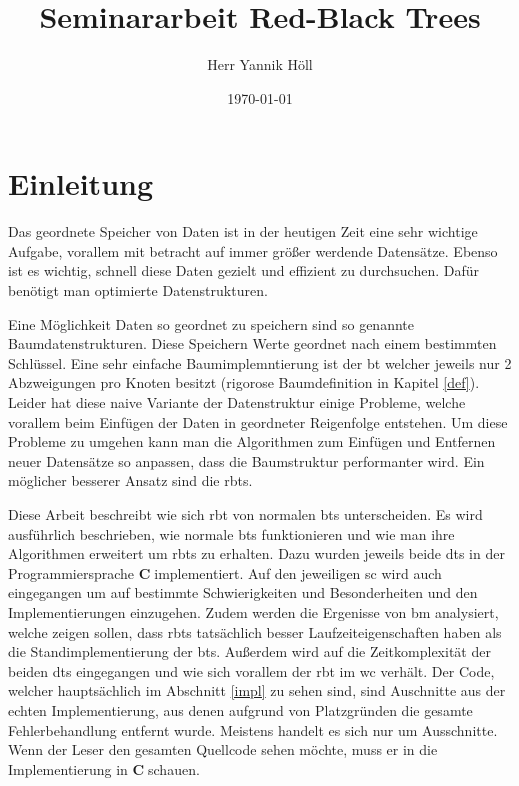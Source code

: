 \documentclass[11pt]{article}
\title{\textbf{Seminararbeit Red-Black Trees}}
\author{Herr Yannik Höll}
\date{\today}
\newcommand{\cpl}{\textbf{C}$\;$}
\begin{document}
\begin{titlingpage}
    \maketitle
\end{titlingpage}
\pagebreak

\tableofcontents
\pagebreak

\listoffigures
\pagebreak

\glsaddall
\printglossary
\pagebreak

\section{Einleitung}

Das geordnete Speicher von Daten ist in der heutigen Zeit eine sehr wichtige Aufgabe, vorallem mit betracht auf immer größer werdende Datensätze.
Ebenso ist es wichtig, schnell diese Daten gezielt und effizient zu durchsuchen. Dafür benötigt man optimierte Datenstrukturen. 

Eine Möglichkeit Daten so geordnet zu speichern sind so genannte Baumdatenstrukturen. Diese Speichern Werte geordnet nach einem bestimmten Schlüssel.
Eine sehr einfache Baumimplemntierung ist der \gls{bt} welcher jeweils nur 2 Abzweigungen pro Knoten besitzt (rigorose Baumdefinition in Kapitel \ref{def}).
Leider hat diese naive Variante der Datenstruktur einige Probleme, welche vorallem beim Einfügen der Daten in geordneter Reigenfolge entstehen.
Um diese Probleme zu umgehen kann man die Algorithmen zum Einfügen und Entfernen neuer Datensätze so anpassen, dass die Baumstruktur performanter wird.
Ein möglicher besserer Ansatz sind die \glspl{rbt}.

Diese Arbeit beschreibt wie sich \gls{rbt} von normalen \glspl{bt} unterscheiden. Es wird ausführlich beschrieben, wie normale \glspl{bt} funktionieren und wie man
ihre Algorithmen erweitert um \glspl{rbt} zu erhalten.
Dazu wurden jeweils beide \glspl{dt} in der Programmiersprache \cpl implementiert. Auf den jeweiligen \gls{sc} wird auch eingegangen um auf bestimmte Schwierigkeiten und Besonderheiten und den Implementierungen einzugehen.
Zudem werden die Ergenisse von \gls{bm} analysiert, welche zeigen sollen, dass \glspl{rbt} tatsächlich besser Laufzeiteigenschaften haben als
die Standimplementierung der \glspl{bt}.
Außerdem wird auf die Zeitkomplexität der beiden \glspl{dt} eingegangen und wie sich vorallem der \gls{rbt} im \gls{wc} verhält.
Der Code, welcher hauptsächlich im Abschnitt \ref{impl} zu sehen sind, sind Auschnitte aus der echten Implementierung, 
aus denen aufgrund von Platzgründen die gesamte Fehlerbehandlung entfernt wurde. Meistens handelt es sich nur um Ausschnitte. 
Wenn der Leser den gesamten Quellcode sehen möchte, muss er in die Implementierung in \cpl schauen. 
\end{document}
